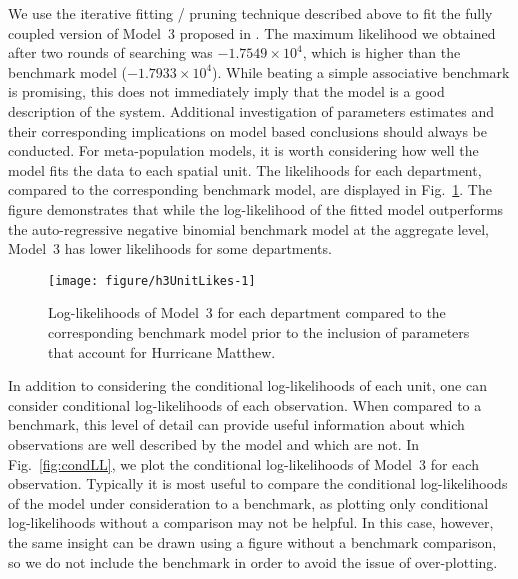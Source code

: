 We use the iterative fitting / pruning technique described above to fit the fully coupled version of Model~3 proposed in \cite{lee20}.
The maximum likelihood we obtained after two rounds of searching was $\ensuremath{-1.7549\times 10^{4}}$, which is higher than the benchmark model ($\ensuremath{-1.7933\times 10^{4}}$).
While beating a simple associative benchmark is promising, this does not immediately imply that the model is a good description of the system.
Additional investigation of parameters estimates and their corresponding implications on model based conclusions should always be conducted.
For meta-population models, it is worth considering how well the model fits the data to each spatial unit.
The likelihoods for each department, compared to the corresponding benchmark model, are displayed in Fig.~\ref{fig:h3UnitLikes}.
The figure demonstrates that while the log-likelihood of the fitted model outperforms the auto-regressive negative binomial benchmark model at the aggregate level, Model~3 has lower likelihoods for some departments.

\begin{figure}[!ht]
\begin{knitrout}
\color{fgcolor}
\texttt{[image: figure/h3UnitLikes-1]} 
\end{knitrout}
\caption[Model~3 unit log-likelihoods.]{\label{fig:h3UnitLikes}Log-likelihoods of Model~3 for each department compared to the corresponding benchmark model prior to the inclusion of parameters that account for Hurricane Matthew.}
\end{figure}

In addition to considering the conditional log-likelihoods of each unit, one can consider conditional log-likelihoods of each observation.
When compared to a benchmark, this level of detail can provide useful information about which observations are well described by the model and which are not.
In Fig.~\ref{fig:condLL}, we plot the conditional log-likelihoods of Model~3 for each observation.
Typically it is most useful to compare the conditional log-likelihoods of the model under consideration to a benchmark, as plotting only conditional log-likelihoods without a comparison may not be helpful.
In this case, however, the same insight can be drawn using a figure without a benchmark comparison, so we do not include the benchmark in order to avoid the issue of over-plotting.

